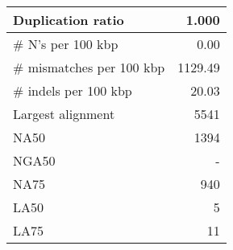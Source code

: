\documentclass[12pt,a4paper]{article}
\begin{document}
\begin{table}[ht]
\begin{center}
\begin{tabular}{|l*{1}{|r}|}
Duplication ratio & 1.000 \\ \hline
\# N's per 100 kbp & 0.00 \\ \hline
\# mismatches per 100 kbp & 1129.49 \\ \hline
\# indels per 100 kbp & 20.03 \\ \hline
Largest alignment & 5541 \\ \hline
NA50 & 1394 \\ \hline
NGA50 & - \\ \hline
NA75 & 940 \\ \hline
LA50 & 5 \\ \hline
LA75 & 11 \\ \hline
\end{tabular}
\end{center}
\end{table}
\end{document}
